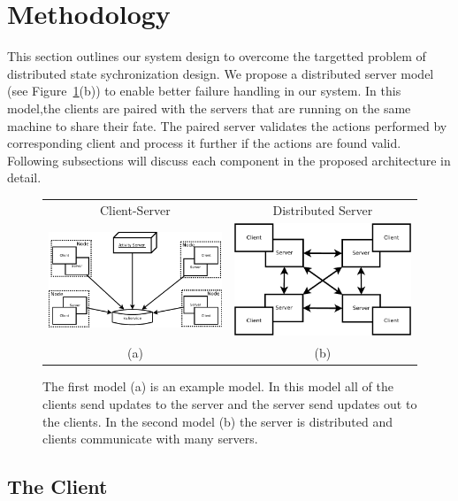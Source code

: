 
\section{Methodology}
\label{sec:methodology}

	This section outlines our system design to overcome the targetted problem of distributed state sychronization design. We propose a distributed server model (see Figure~\ref{figure:server-models}(b)) to enable better failure handling in our system. In this model,the clients are paired with the servers that are running on the same machine to share their fate. The paired server validates the actions performed by corresponding client and process it further if the actions are found valid. Following subsections will discuss each component in the proposed architecture in detail.

\begin{figure}[ht]
	\centering
	\begin{tabular}{c c}
		Client-Server & Distributed Server \\
		\includegraphics[width=0.44\linewidth]{../images/client-distributed-server-model-Activity.pdf} &
		\includegraphics[width=0.48\linewidth]{../images/client-distributed-server-model-crop.pdf} \\
		(a) & (b)
	\end{tabular}
	
	\caption{\label{figure:server-models} The first model (a) is an example \clientServer model. In this model all of the clients send updates to the server and the server send updates out to the clients. In the second model (b) the server is distributed and clients communicate with many servers.}
\end{figure}


\subsection{The Client}

